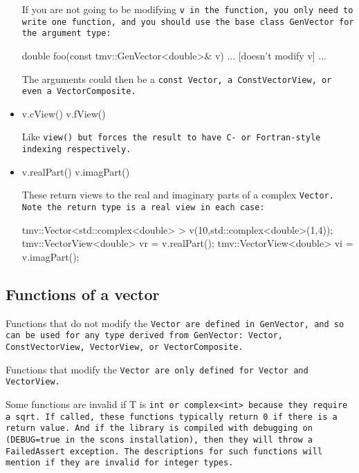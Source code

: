 \begin{itemize}
If you are not going to be modifying \tt{v} in the function, you only need to
write one function, and you should use the base class \tt{GenVector} 
for the argument type:
\begin{tmvcode}
double foo(const tmv::GenVector<double>& v)
{ ... [doesn't modify v] ... }
\end{tmvcode}
The arguments could then be a \tt{const Vector}, a \tt{ConstVectorView},
or even a \tt{VectorComposite}.

\item
\begin{tmvcode}
v.cView()
v.fView()
\end{tmvcode}
Like \tt{view()} but forces the result to have C- or Fortran-style indexing respectively.

\item
\begin{tmvcode}
v.realPart()
v.imagPart()
\end{tmvcode}
These return views to the real and imaginary parts of a complex \tt{Vector}.
Note the return type is a real view in each case:
\begin{tmvcode}
tmv::Vector<std::complex<double> > v(10,std::complex<double>(1,4));
tmv::VectorView<double> vr = v.realPart();
tmv::VectorView<double> vi = v.imagPart();
\end{tmvcode}

\end{itemize}

\subsection{Functions of a vector }
\label{Vector_Functions}

Functions that do not modify the \tt{Vector} are defined in 
\tt{GenVector}, and so can be used for any type derived from \tt{GenVector}:
\tt{Vector, ConstVectorView, VectorView,} or \tt{VectorComposite}.

Functions that modify the \tt{Vector} are only defined for 
\tt{Vector} and \tt{VectorView}.

Some functions are invalid if T is \tt{int} or \tt{complex<int>} because they require 
a \tt{sqrt}.  If called, these functions typically return \tt{0} if there is a return value.
And if the library is compiled with debugging on (\tt{DEBUG=true} in the scons installation),
then they will throw a \tt{FailedAssert} exception.  The descriptions for such functions
will mention if they are invalid for integer types.

